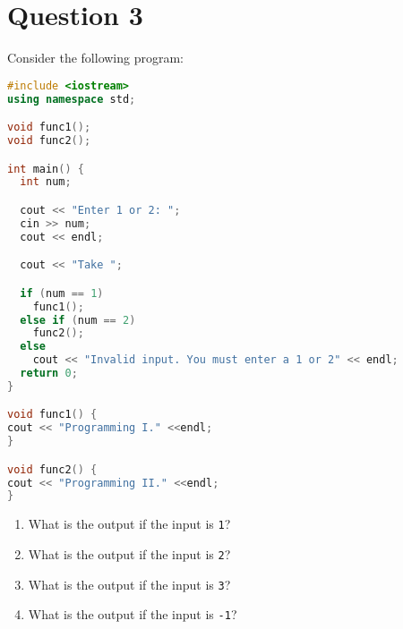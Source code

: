 \documentclass[a4paper, 11pt]{article}
\begin{document}
    
  \newpage
  \section{Question 3}
    Consider the following program:

    \begin{lstlisting}[language=c++,caption={Question 3 Problem}]
#include <iostream>
using namespace std;

void func1();
void func2();

int main() {
  int num;

  cout << "Enter 1 or 2: ";
  cin >> num;
  cout << endl;

  cout << "Take ";

  if (num == 1)
    func1();
  else if (num == 2)
    func2();
  else
    cout << "Invalid input. You must enter a 1 or 2" << endl;
  return 0;
}

void func1() {
cout << "Programming I." <<endl;
}

void func2() {
cout << "Programming II." <<endl;
}
    \end{lstlisting}

    \begin{enumerate}[label=\Alph*.]
      \item What is the output if the input is \texttt{1}?
      \item What is the output if the input is \texttt{2}?
      \item What is the output if the input is \texttt{3}?
      \item What is the output if the input is \texttt{-1}?
    \end{enumerate}
    
\end{document}
